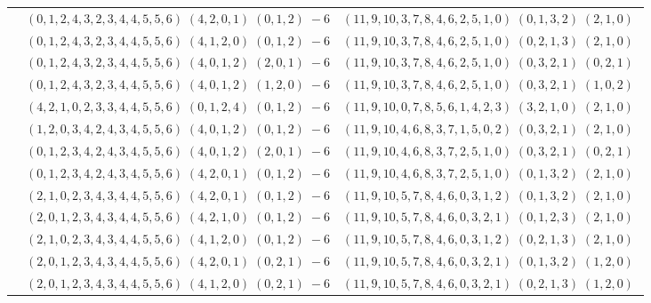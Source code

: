 \documentclass[11pt]{article}
\begin{document}
\begin{longtable}[l]{|c|c|c|}
 \cline{2-3} 
 & $(0 ,1 ,2 ,4 ,3 ,2 ,3 ,4 ,4 ,5 ,5 ,6) \;(4 ,2 ,0 ,1) \;(0 ,1 ,2) \;-6$ & $(11 ,9 ,10 ,3 ,7 ,8 ,4 ,6 ,2 ,5 ,1 ,0) \;(0 ,1 ,3 ,2) \;(2 ,1 ,0) \;$\\ 
 \cline{2-3} 
 & $(0 ,1 ,2 ,4 ,3 ,2 ,3 ,4 ,4 ,5 ,5 ,6) \;(4 ,1 ,2 ,0) \;(0 ,1 ,2) \;-6$ & $(11 ,9 ,10 ,3 ,7 ,8 ,4 ,6 ,2 ,5 ,1 ,0) \;(0 ,2 ,1 ,3) \;(2 ,1 ,0) \;$\\ 
 \cline{2-3} 
 & $(0 ,1 ,2 ,4 ,3 ,2 ,3 ,4 ,4 ,5 ,5 ,6) \;(4 ,0 ,1 ,2) \;(2 ,0 ,1) \;-6$ & $(11 ,9 ,10 ,3 ,7 ,8 ,4 ,6 ,2 ,5 ,1 ,0) \;(0 ,3 ,2 ,1) \;(0 ,2 ,1) \;$\\ 
 \cline{2-3} 
 & $(0 ,1 ,2 ,4 ,3 ,2 ,3 ,4 ,4 ,5 ,5 ,6) \;(4 ,0 ,1 ,2) \;(1 ,2 ,0) \;-6$ & $(11 ,9 ,10 ,3 ,7 ,8 ,4 ,6 ,2 ,5 ,1 ,0) \;(0 ,3 ,2 ,1) \;(1 ,0 ,2) \;$\\ 
 \cline{2-3} 
 & $(4 ,2 ,1 ,0 ,2 ,3 ,3 ,4 ,4 ,5 ,5 ,6) \;(0 ,1 ,2 ,4) \;(0 ,1 ,2) \;-6$ & $(11 ,9 ,10 ,0 ,7 ,8 ,5 ,6 ,1 ,4 ,2 ,3) \;(3 ,2 ,1 ,0) \;(2 ,1 ,0) \;$\\ 
 \cline{2-3} 
 & $(1 ,2 ,0 ,3 ,4 ,2 ,4 ,3 ,4 ,5 ,5 ,6) \;(4 ,0 ,1 ,2) \;(0 ,1 ,2) \;-6$ & $(11 ,9 ,10 ,4 ,6 ,8 ,3 ,7 ,1 ,5 ,0 ,2) \;(0 ,3 ,2 ,1) \;(2 ,1 ,0) \;$\\ 
 \cline{2-3} 
 & $(0 ,1 ,2 ,3 ,4 ,2 ,4 ,3 ,4 ,5 ,5 ,6) \;(4 ,0 ,1 ,2) \;(2 ,0 ,1) \;-6$ & $(11 ,9 ,10 ,4 ,6 ,8 ,3 ,7 ,2 ,5 ,1 ,0) \;(0 ,3 ,2 ,1) \;(0 ,2 ,1) \;$\\ 
 \cline{2-3} 
 & $(0 ,1 ,2 ,3 ,4 ,2 ,4 ,3 ,4 ,5 ,5 ,6) \;(4 ,2 ,0 ,1) \;(0 ,1 ,2) \;-6$ & $(11 ,9 ,10 ,4 ,6 ,8 ,3 ,7 ,2 ,5 ,1 ,0) \;(0 ,1 ,3 ,2) \;(2 ,1 ,0) \;$\\ 
 \cline{2-3} 
 & $(2 ,1 ,0 ,2 ,3 ,4 ,3 ,4 ,4 ,5 ,5 ,6) \;(4 ,2 ,0 ,1) \;(0 ,1 ,2) \;-6$ & $(11 ,9 ,10 ,5 ,7 ,8 ,4 ,6 ,0 ,3 ,1 ,2) \;(0 ,1 ,3 ,2) \;(2 ,1 ,0) \;$\\ 
 \cline{2-3} 
 & $(2 ,0 ,1 ,2 ,3 ,4 ,3 ,4 ,4 ,5 ,5 ,6) \;(4 ,2 ,1 ,0) \;(0 ,1 ,2) \;-6$ & $(11 ,9 ,10 ,5 ,7 ,8 ,4 ,6 ,0 ,3 ,2 ,1) \;(0 ,1 ,2 ,3) \;(2 ,1 ,0) \;$\\ 
 \cline{2-3} 
 & $(2 ,1 ,0 ,2 ,3 ,4 ,3 ,4 ,4 ,5 ,5 ,6) \;(4 ,1 ,2 ,0) \;(0 ,1 ,2) \;-6$ & $(11 ,9 ,10 ,5 ,7 ,8 ,4 ,6 ,0 ,3 ,1 ,2) \;(0 ,2 ,1 ,3) \;(2 ,1 ,0) \;$\\ 
 \cline{2-3} 
 & $(2 ,0 ,1 ,2 ,3 ,4 ,3 ,4 ,4 ,5 ,5 ,6) \;(4 ,2 ,0 ,1) \;(0 ,2 ,1) \;-6$ & $(11 ,9 ,10 ,5 ,7 ,8 ,4 ,6 ,0 ,3 ,2 ,1) \;(0 ,1 ,3 ,2) \;(1 ,2 ,0) \;$\\ 
 \cline{2-3} 
 & $(2 ,0 ,1 ,2 ,3 ,4 ,3 ,4 ,4 ,5 ,5 ,6) \;(4 ,1 ,2 ,0) \;(0 ,2 ,1) \;-6$ & $(11 ,9 ,10 ,5 ,7 ,8 ,4 ,6 ,0 ,3 ,2 ,1) \;(0 ,2 ,1 ,3) \;(1 ,2 ,0) \;$\\ 

\end{longtable}
\end{document}
